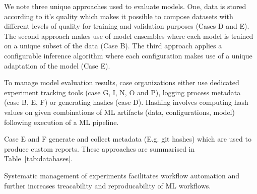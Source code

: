 We note three unique approaches used to evaluate models. One, data is stored according to it's quality which makes it possible to compose datasets with different levels of quality for training and validation purposes (Cases D and E). The second approach makes use of model ensembles where each model is trained on a unique subset of the data (Case B). The third approach applies a configurable inference algorithm where each configuration makes use of a unique adaptation of the model (Case E). %

To manage model evaluation results, case organizations either use dedicated experiment tracking tools (case G, I, N, O and P), logging process metadata (case B, E, F) or generating hashes (case D). Hashing involves computing hash values on given combinations of ML artifacts (data, configurations, model) following execution of a ML pipeline.


Case E and F generate and collect metadata (E.g. git hashes) which are used to produce custom reports. These approaches are summarised in Table~\ref{tab:databases}.

Systematic management of experiments facilitates workflow automation and further increases treacability and reproducability of ML workflows.


